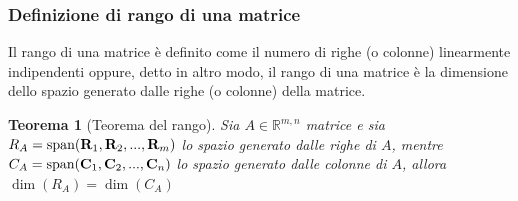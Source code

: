 \documentclass{article}
\newtheorem{theorem}{Teorema}
\begin{document}
    \vspace{10pt}
    \subsubsection{Definizione di rango di una matrice} \label{subsubsec:matrankdef}
    Il rango di una matrice è definito come il numero di righe (o colonne) linearmente indipendenti oppure, detto in altro modo, il rango di una matrice è la dimensione dello spazio generato dalle righe (o colonne) della matrice.

    \vspace{10pt}
    \begin{theorem}[Teorema del rango]
        Sia $A \in \mathbb{R}^{m, n}$ matrice e sia $R_A = \textnormal{span}(\mathbf{R}_{1}, \mathbf{R}_{2}, ..., \mathbf{R}_{m})$ lo spazio generato dalle righe di $A$, mentre $C_A = \textnormal{span}(\mathbf{C}_{1}, \mathbf{C}_{2}, ..., \mathbf{C}_{n})$ lo spazio
        generato dalle colonne di $A$, allora $\dim(R_A) = \dim(C_A)$     
    \end{theorem}
\end{document}
